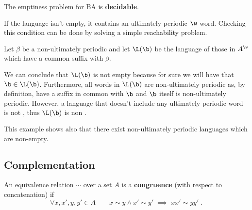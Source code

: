 \documentclass[oneside]{academica}
\begin{document}

\begin{theorem*}
  The emptiness problem for BA is \textbf{decidable}.
\end{theorem*}

\begin{proof*}
  If the language isn't empty, it contains an ultimately periodic $\w$-word.
  Checking this condition can be done by solving a simple reachability problem.
\end{proof*}

\begin{example*}
  Let $\beta$ be a non-ultimately periodic \wword and let $\L(\b)$ be the language of those \wwords in $\Aw$ which have a common suffix with $\beta$.

  We can conclude that $\L(\b)$ is not empty because for sure we will have that $\b\in \L(\b)$.
  Furthermore, all words in $\L(\b)$ are non-ultimately periodic as, by definition, have a suffix in common with $\b$ and $\b$ itself is non-ultimately periodic.
  However, a language that doesn't include any ultimately periodic word is not \wreg, thus $\L(\b)$ is non \wreg.

  \bigskip
  This example shows also that there exist non-ultimately periodic languages which are non-empty.
\end{example*}

\subsection{Complementation}

\begin{definition*}[Congruence]
  An equivalence relation $\sim$ over a set $A$ is a \textbf{congruence} (with respect to concatenation) if
  \begin{equation*}
    \forall x, x', y, y' \in A \qquad x \sim y \land x' \sim y' \;\implies\; xx' \sim yy'\; .
  \end{equation*}
\end{definition*}
\end{document}
